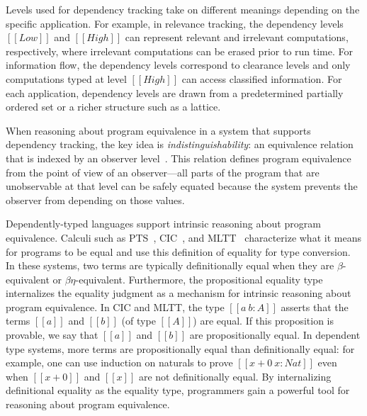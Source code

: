 \documentclass[acmsmall]{acmart}
\begin{document}
Levels used for dependency tracking take on different meanings depending on
the specific application. For example, in relevance tracking, the dependency
levels $[[Low]]$ and $[[High]]$ can represent relevant and irrelevant
computations, respectively, where irrelevant computations can be erased prior to
run time. For information flow, the dependency levels correspond to clearance
levels and only computations typed at level $[[High]]$ can access classified
information.
For each application, dependency levels are drawn from a predetermined
partially ordered set or a richer structure such as a lattice.

When reasoning about program equivalence in a system that supports dependency
tracking, the key idea is \emph{indistinguishability}: an equivalence relation
that is indexed by an observer level~\citep{sabelfeld2003language}. This
relation defines program equivalence from the point of view of an
observer---all parts of the program that are unobservable at that level can be
safely equated because the system prevents the observer from depending on
those values.

Dependently-typed languages support intrinsic reasoning about program
equivalence. Calculi such as
PTS~\citep{barendregt:lambda-calculi-with-types}, CIC~\citep{CIC}, and
MLTT~\citep{Martin-Lof-1973} characterize what it means for programs to be
equal and use this definition of equality for type conversion.  In these
systems, two terms are typically definitionally equal when they are
$\beta$-equivalent or $\beta\eta$-equivalent. Furthermore, the propositional
equality type internalizes the equality judgment as a mechanism for intrinsic
reasoning about program equivalence. In CIC and MLTT, the type $[[a ~ b : A]]$
asserts that the terms $[[a]]$ and $[[b]]$ (of type $[[A]]$) are equal.  If
this proposition is provable, we say that $[[a]]$ and $[[b]]$ are
propositionally equal. In dependent type systems, more terms are
propositionally equal than definitionally equal: for example, one can use
induction on naturals to prove $[[x + 0 ~ x : Nat]]$ even when $[[x+0]]$
and $[[x]]$ are not definitionally equal.  By internalizing definitional
equality as the equality type, programmers gain a powerful tool for reasoning
about program equivalence.
\end{document}
